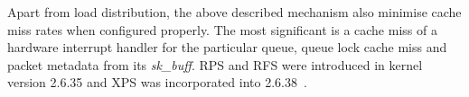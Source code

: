 Apart from load distribution, the above described mechanism also minimise cache miss rates when configured properly.
The most significant is a cache miss of a hardware interrupt handler for the particular queue,
queue lock cache miss and packet metadata from its {\it{sk\_buff}}.
RPS and RFS were introduced in kernel version 2.6.35
and XPS was incorporated into 2.6.38~\cite{kernel-doc-scaling}.

